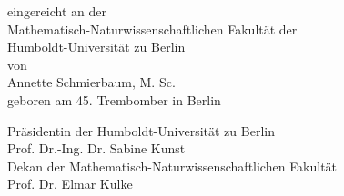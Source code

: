 \begin{titlepage}
\begin{center}
    \vspace{0.2cm}
    
    \begin{large}
      \begin{center}
	eingereicht an der\\
        \vspace{0.2cm}
    Mathematisch-Naturwissenschaftlichen Fakult\"at der\\
    Humboldt-Universit\"at zu Berlin\\
        \vspace{0.5cm}
    von \\
        \vspace{0.5cm}
        Annette Schmierbaum, M. Sc. \\
        geboren am 45. Trembomber in Berlin
      \end{center}
    \end{large}
    
    \vspace{0.5cm}

    \begin{large}
      \begin{center}
	Pr{\"a}sidentin der Humboldt-Universit\"at zu Berlin \\
        \vspace{0.1cm}
    Prof. Dr.-Ing. Dr. Sabine Kunst\\
        \vspace{0.4cm}
    Dekan der Mathematisch-Naturwissenschaftlichen Fakult\"at\\
        \vspace{0.1cm}
    Prof. Dr. Elmar Kulke
      \end{center}
    \end{large}
    
  \end{center}

\end{titlepage}

\newpage
\thispagestyle{empty}
\quad
\newpage
\setcounter{page}{1}
